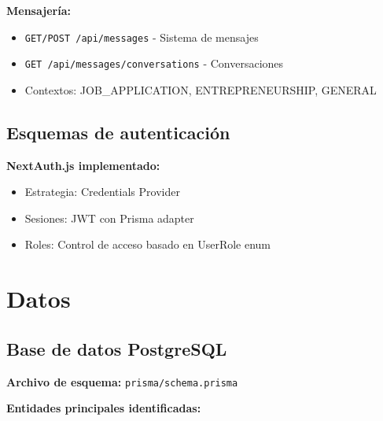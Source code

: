 \documentclass[12pt,a4paper]{article}
\begin{document}
\textbf{Mensajería:}
\begin{itemize}
    \item \texttt{GET/POST /api/messages} - Sistema de mensajes
    \item \texttt{GET /api/messages/conversations} - Conversaciones
    \item Contextos: JOB\_APPLICATION, ENTREPRENEURSHIP, GENERAL
\end{itemize}

\subsection{Esquemas de autenticación}

\textbf{NextAuth.js implementado:}
\begin{itemize}
    \item Estrategia: Credentials Provider
    \item Sesiones: JWT con Prisma adapter
    \item Roles: Control de acceso basado en UserRole enum
\end{itemize}

\section{Datos}

\subsection{Base de datos PostgreSQL}

\textbf{Archivo de esquema:} \texttt{prisma/schema.prisma}

\textbf{Entidades principales identificadas:}
\end{document}
